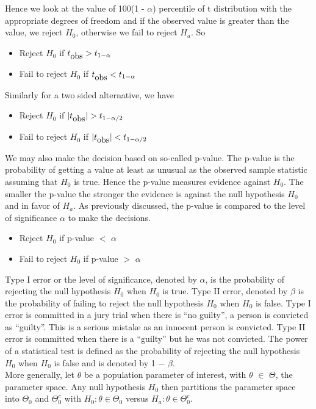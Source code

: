\documentclass[12]{report}
\begin{document}
 Hence we look at the value of 100(1 - $\alpha$) percentile of t distribution with the appropriate degrees of freedom and if the observed value is greater than the value, we reject $H_0$, otherwise we fail to reject $H_a$. So
 \begin{itemize}
 \item Reject $H_0$ if $t_{\hbox{obs}} > t_{1 - \alpha}$
 \item Fail to reject $H_0$ if $t_{\hbox{obs}} < t_{1 - \alpha}$
 \end{itemize}
Similarly for a two sided alternative, we have 
  \begin{itemize}
 \item Reject $H_0$ if $|t_{\hbox{obs}}| > t_{1 - \alpha/2}$
 \item Fail to reject $H_0$ if $|t_{\hbox{obs}}| < t_{1 - \alpha/2}$
 \end{itemize}
 We may also make the decision based on so-called p-value. The p-value is the probability of getting a value at least as unusual as the observed sample statistic assuming that $H_0$ is true. Hence the p-value measures evidence against $H_0$. The smaller the p-value the stronger the evidence is against the null hypothesis $H_0$ and in favor of $H_a$. As previously discussed, the p-value is compared to the level of significance $\alpha$ to make the decisions.
  \begin{itemize}
 \item Reject $H_0$ if p-value $<$ $\alpha$
 \item Fail to reject $H_0$ if p-value $>$ $\alpha$
 \end{itemize}
 Type I error or the level of significance, denoted by $\alpha$, is the probability of rejecting the null hypothesis $H_0$ when $H_0$ is true. Type II error, denoted by $\beta$ is the probability of failing to reject the null hypothesis $H_0$ when $H_0$ is false. Type I error is committed in a jury trial when there is ``no guilty'', a person is convicted as ``guilty''. This is a serious mistake as an innocent person is convicted. Type II error is committed when there is a ``guilty'' but he was not convicted. The power of a statistical test is defined as the probability of rejecting the null hypothesis $H_0$ when $H_0$ is false and is denoted by 1 $-$ $\beta$. \\
 
More generally, let $\theta$ be a population parameter of interest, with $\theta$ $\in$ $\Theta$, the parameter space. Any null hypothesis $H_0$ then partitions the parameter space into $\Theta_0$ and $\Theta_0^c$ with $H_0: \theta \in \Theta_0$ versus $H_a: \theta  \in \Theta_0^c$. \\
\end{document}
